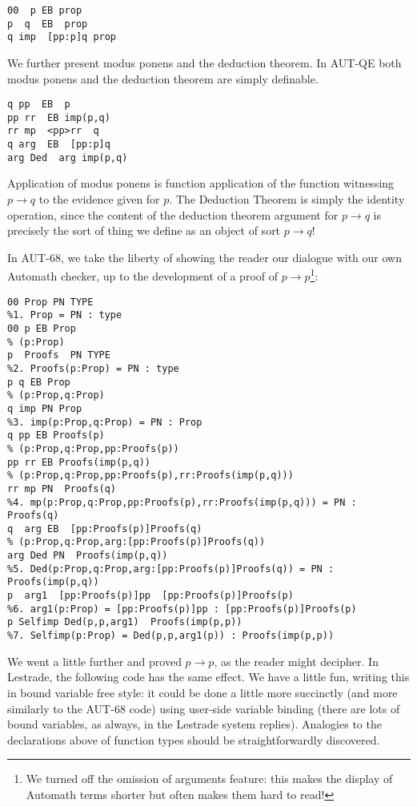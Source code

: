 \documentclass{article}
\begin{document}
   \begin{verbatim}
00  p EB prop
p  q  EB  prop
q imp  [pp:p]q prop
\end{verbatim}



We further present modus ponens and the deduction theorem. In AUT-QE
both modus ponens and the deduction theorem are simply definable.

   \begin{verbatim}
q pp  EB  p
pp rr  EB imp(p,q)
rr mp  <pp>rr  q
q arg  EB  [pp:p]q
arg Ded  arg imp(p,q)
\end{verbatim}

Application of modus ponens is function application of the function witnessing $p \rightarrow q$ to the evidence given for $p$.  The Deduction Theorem is simply the identity operation, since the content of the deduction theorem argument for $p \rightarrow q$ is precisely the sort of thing we define as an object of sort $p \rightarrow q$!

In AUT-68, we take the liberty of showing the reader our dialogue with our own Automath checker, up to the development of a proof of $p\rightarrow p$\footnote{We turned off the omission of arguments feature:  this makes the display of Automath terms shorter but often makes them hard to read!}:

   \begin{verbatim}
00 Prop PN TYPE
%1. Prop = PN : type
00 p EB Prop
% (p:Prop)
p  Proofs  PN TYPE
%2. Proofs(p:Prop) = PN : type
p q EB Prop
% (p:Prop,q:Prop)
q imp PN Prop
%3. imp(p:Prop,q:Prop) = PN : Prop
q pp EB Proofs(p)
% (p:Prop,q:Prop,pp:Proofs(p))
pp rr EB Proofs(imp(p,q))
% (p:Prop,q:Prop,pp:Proofs(p),rr:Proofs(imp(p,q)))
rr mp PN  Proofs(q)
%4. mp(p:Prop,q:Prop,pp:Proofs(p),rr:Proofs(imp(p,q))) = PN : Proofs(q)
q  arg EB  [pp:Proofs(p)]Proofs(q)
% (p:Prop,q:Prop,arg:[pp:Proofs(p)]Proofs(q))
arg Ded PN  Proofs(imp(p,q))
%5. Ded(p:Prop,q:Prop,arg:[pp:Proofs(p)]Proofs(q)) = PN : Proofs(imp(p,q))
p  arg1  [pp:Proofs(p)]pp  [pp:Proofs(p)]Proofs(p)
%6. arg1(p:Prop) = [pp:Proofs(p)]pp : [pp:Proofs(p)]Proofs(p)
p Selfimp Ded(p,p,arg1)  Proofs(imp(p,p))
%7. Selfimp(p:Prop) = Ded(p,p,arg1(p)) : Proofs(imp(p,p))
\end{verbatim}

We went a little further and proved $p \rightarrow p$, as the reader might decipher.  In Lestrade, the following code has the same effect.  We have a little fun, writing this in bound variable free style:  it could be done a little more succinctly (and more similarly to the AUT-68 code) using user-side variable binding (there are lots of bound variables, as always, in the Lestrade system replies).  Analogies to the declarations above of function types should be straightforwardly discovered.
\end{document}
